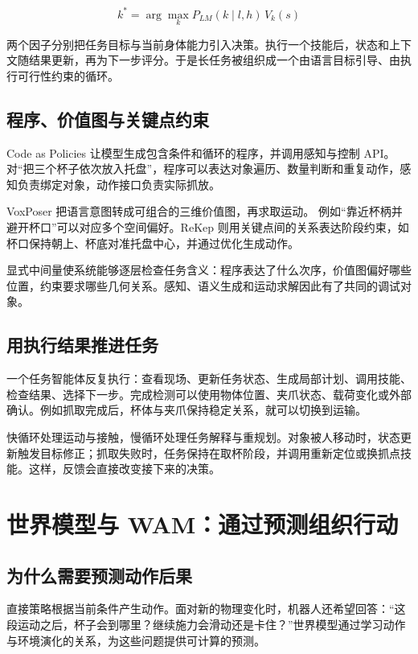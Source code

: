 \documentclass[UTF8,a4paper,11pt,oneside,openany,fontset=none]{ctexbook}
\begin{document}
\[
k^*=\arg\max_k P_{LM}(k\mid l,h)\,V_k(s)
\]

两个因子分别把任务目标与当前身体能力引入决策。执行一个技能后，状态和上下文随结果更新，再为下一步评分。于是长任务被组织成一个由语言目标引导、由执行可行性约束的循环。

\section{程序、价值图与关键点约束}

Code as Policies 让模型生成包含条件和循环的程序，并调用感知与控制 API。\cite{R22} 对``把三个杯子依次放入托盘''，程序可以表达对象遍历、数量判断和重复动作，感知负责绑定对象，动作接口负责实际抓放。

VoxPoser 把语言意图转成可组合的三维价值图，再求取运动。\cite{R23} 例如``靠近杯柄并避开杯口''可以对应多个空间偏好。ReKep 则用关键点间的关系表达阶段约束，如杯口保持朝上、杯底对准托盘中心，并通过优化生成动作。\cite{R24}

显式中间量使系统能够逐层检查任务含义：程序表达了什么次序，价值图偏好哪些位置，约束要求哪些几何关系。感知、语义生成和运动求解因此有了共同的调试对象。

\section{用执行结果推进任务}

一个任务智能体反复执行：查看现场、更新任务状态、生成局部计划、调用技能、检查结果、选择下一步。完成检测可以使用物体位置、夹爪状态、载荷变化或外部确认。例如抓取完成后，杯体与夹爪保持稳定关系，就可以切换到运输。

快循环处理运动与接触，慢循环处理任务解释与重规划。对象被人移动时，状态更新触发目标修正；抓取失败时，任务保持在取杯阶段，并调用重新定位或换抓点技能。这样，反馈会直接改变接下来的决策。

\chapter{世界模型与 WAM：通过预测组织行动}

\section{为什么需要预测动作后果}

直接策略根据当前条件产生动作。面对新的物理变化时，机器人还希望回答：``这段运动之后，杯子会到哪里？继续施力会滑动还是卡住？''世界模型通过学习动作与环境演化的关系，为这些问题提供可计算的预测。
\end{document}
